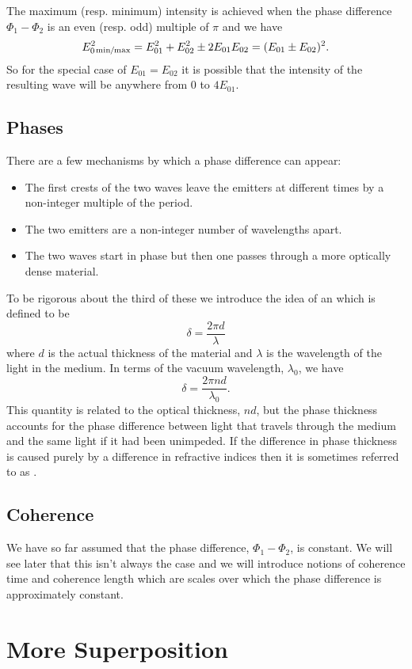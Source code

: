     The maximum (resp. minimum) intensity is achieved when the phase difference \(\Phi_1 - \Phi_2\) is an even (resp. odd) multiple of \(\pi\) and we have
    \[E_{0}^2{_{\min\mkern-4mu/\mkern-4mu\max}} = E_{01}^2 + E_{02}^2 \pm 2E_{01}E_{02} = (E_{01} \pm E_{02})^2.\]
    So for the special case of \(E_{01} = E_{02}\) it is possible that the intensity of the resulting wave will be anywhere from 0 to \(4E_{01}\).
    
    \subsection{Phases}
    There are a few mechanisms by which a phase difference can appear:
    \begin{itemize}
        \item The first crests of the two waves leave the emitters at different times by a non-integer multiple of the period.
        \item The two emitters are a non-integer number of wavelengths apart.
        \item The two waves start in phase but then one passes through a more optically dense material.
    \end{itemize}
    To be rigorous about the third of these we introduce the idea of an  which is defined to be
    \[\delta = \frac{2\pi d}{\lambda}\]
    where \(d\) is the actual thickness of the material and \(\lambda\) is the wavelength of the light in the medium.
    In terms of the vacuum wavelength, \(\lambda_0\), we have
    \[\delta = \frac{2\pi nd}{\lambda_0}.\]
    This quantity is related to the optical thickness, \(nd\), but the phase thickness accounts for the phase difference between light that travels through the medium and the same light if it had been unimpeded.
    If the difference in phase thickness is caused purely by a difference in refractive indices then it is sometimes referred to as .
    
    \subsection{Coherence}
    We have so far assumed that the phase difference, \(\Phi_1 - \Phi_2\), is constant.
    We will see later that this isn't always the case and we will introduce notions of coherence time and coherence length which are scales over which the phase difference is approximately constant.
    
    \section{More Superposition}
